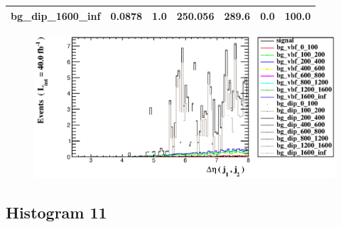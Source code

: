 \documentclass[a4paper, 10pt]{article}
\begin{document}
\begin{table}[H]
\begin{center}
\begin{tabular}{|m{23.0mm}|m{23.0mm}|m{18.0mm}|m{19.0mm}|m{19.0mm}|m{19.0mm}|m{19.0mm}|}
      \hline
      {\cellcolor{white}         bg\_dip\_1600\_inf}& {\cellcolor{white}         0.0878}& {\cellcolor{white}         1.0}& {\cellcolor{white}         250.056}& {\cellcolor{white}         289.6}& {\cellcolor{red}         0.0}& {\cellcolor{red}         100.0}\\
\hline
    \end{tabular}
  \end{center}
\end{table}

\begin{figure}[H]
  \begin{center}
    \includegraphics[scale=0.45]{selection_9.eps}\\
\caption{   }
  \end{center}
\end{figure}
      \newpage
\subsection{ Histogram 11}
\end{document}
